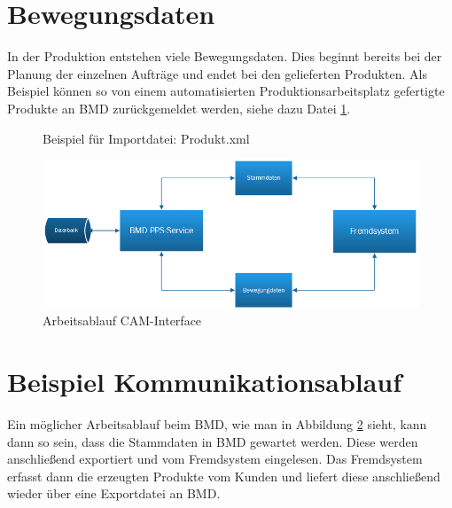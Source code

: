 \section{Bewegungsdaten}
In der Produktion entstehen viele Bewegungsdaten. Dies beginnt bereits bei der Planung der einzelnen Aufträge und endet bei den gelieferten Produkten. Als Beispiel können so von einem automatisierten Produktionsarbeitsplatz gefertigte Produkte an BMD zurückgemeldet werden, siehe dazu Datei \ref{fig:ProduktImp}. 

\begin{figure}
\centering
{}
    
\caption{Beispiel für Importdatei: Produkt.xml }
\label{fig:ProduktImp}
\end{figure}

\begin{figure}
    \centering
    \includegraphics[width=.95\textwidth]{images/Systemschema.png}
    \caption{Arbeitsablauf CAM-Interface}
    \label{fig:Arbeitsablauf}
\end{figure}

\section{Beispiel Kommunikationsablauf}
Ein möglicher Arbeitsablauf beim BMD, wie man in Abbildung \ref{fig:Arbeitsablauf} sieht, kann dann so sein, dass die Stammdaten in BMD gewartet werden. Diese werden anschließend exportiert und vom Fremdsystem eingelesen. Das Fremdsystem erfasst dann die erzeugten Produkte vom Kunden und liefert diese anschließend wieder über eine Exportdatei an BMD. 